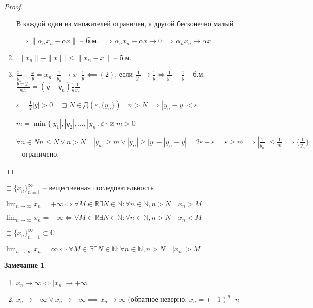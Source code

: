 \documentclass{book}
\newcommand\N{\ensuremath{\mathbb{N}}}
\newcommand\R{\ensuremath{\mathbb{R}}}
\renewcommand\C{\ensuremath{\mathbb{C}}}
\theoremstyle{definition}
\newtheorem*{note}{Замечание}
\begin{document}
\begin{proof}
\begin{enumerate}
            В каждой один из множителей ограничен, а другой бесконечно малый

            $\implies  \|\alpha_nx_n - \alpha x\|$ -- б.м. $\implies  \alpha_nx_n - \alpha x \to  0 \implies  \alpha_nx_n \to  \alpha x$
        \item $\left| \|x_{n} \| - \|x\| \right| \leqslant \|x_{n} -x\|$ -- б.м.

        \item $\frac{x_{n} }{y_{n} } - \frac{x}{y} = x_n\cdot \frac{1}{y_n} \to  x\cdot \frac{1}{y} \impliedby (2)$, если $\frac{1}{y_{n} } \to  \frac{1}{y} \iff  \frac{1}{y_{n} } - \frac{1}{y}$ -- б.м. $\frac{y-y_{n} }{yy_{n} } = (y-y_{n} )\frac{1}{y}\frac{1}{y_{n} }$

        $\varepsilon = \frac{1}{2}|y| >0\quad \sqsupset N \in \text{Д}\left( \varepsilon, \{y_{n} \} \right) \quad n>N \implies  |y_n-y| <\varepsilon$

        $m = \min\{|y_1|, |y_2|, \ldots, |y_n|, \varepsilon\}$ и $m>0$

        $\forall n\in N n\leqslant N \lor n>N\quad |y_n| \geqslant m \lor |y_n| \geqslant |y| - |y_n-y| = 2\varepsilon - \varepsilon = \varepsilon \geqslant m \implies  \left| \frac{1}{y_n} \right| \leqslant \frac{1}{m} \implies \{\frac{1}{y_{n} }\}$ -- ограничено.
        \end{enumerate}
    \end{proof}
    \begin{definition}
        $\sqsupset \{x_{n}\}_{n=1}^{\infty } $ -- вещественная последовательность

        $\lim_{n \to \infty} x_n = +\infty  \iff  \forall M\in \R \exists N\in \N : \forall n\in \N , n>N\quad x_n>M$

        $\lim_{n \to \infty} x_n = -\infty  \iff  \forall M\in \R \exists  N\in \N : \forall n\in \N , n>N\quad x_n<M$

        $\sqsupset \{x_n\}_{n=1}^{\infty } \subset \C$

        $\lim_{n \to \infty} x_n = \infty \iff \forall M\in \R\exists N\in \N : \forall n\in \N , n>N\quad |x_n| >M$
    \end{definition}    
    \begin{note}
        \begin{enumerate}
            \item $x_n \to \infty  \iff  |x_n| \to +\infty $
            \item $x_n\to  +\infty  \lor x_n\to -\infty  \implies  x_n \to  \infty $ (обратное неверно: $x_n = (-1)^n\cdot n$
        \end{enumerate}
    \end{note}
\end{document}
